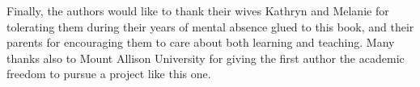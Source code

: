 Finally, the authors would like to thank their wives Kathryn and Melanie for tolerating them during their years of mental absence glued to this book, and their parents for encouraging them to care about both learning and teaching. Many thanks also to Mount Allison University for giving the first author the academic freedom to pursue a project like this one.
